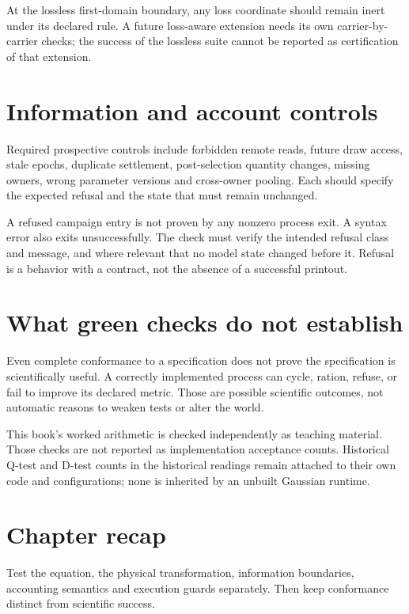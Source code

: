 At the lossless first-domain boundary, any loss coordinate should remain
inert under its declared rule. A future loss-aware extension needs its own
carrier-by-carrier checks; the success of the lossless suite cannot be
reported as certification of that extension.

\section{Information and account controls}
Required prospective controls include forbidden remote reads, future draw
access, stale epochs, duplicate settlement, post-selection quantity changes,
missing owners, wrong parameter versions and cross-owner pooling. Each
should specify the expected refusal and the state that must remain unchanged.

A refused campaign entry is not proven by any nonzero process exit. A syntax
error also exits unsuccessfully. The check must verify the intended refusal
class and message, and where relevant that no model state changed before it.
Refusal is a behavior with a contract, not the absence of a successful printout.

\section{What green checks do not establish}
Even complete conformance to a specification does not prove the specification
is scientifically useful. A correctly implemented process can cycle, ration,
refuse, or fail to improve its declared metric. Those are possible scientific
outcomes, not automatic reasons to weaken tests or alter the world.

This book's worked arithmetic is checked independently as teaching material.
Those checks are not reported as implementation acceptance counts. Historical
Q-test and D-test counts in the historical readings remain attached to their own code
and configurations; none is inherited by an unbuilt Gaussian runtime.

\section*{Chapter recap}
Test the equation, the physical transformation, information boundaries,
accounting semantics and execution guards separately. Then keep conformance
distinct from scientific success.
